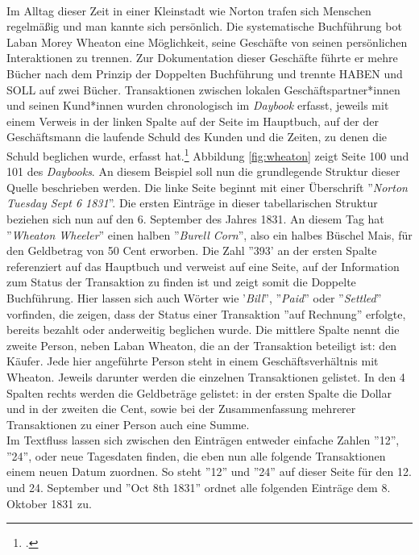 \documentclass[12pt,a4paper]{article}
\begin{document}
\\
Im Alltag dieser Zeit in einer Kleinstadt wie Norton trafen sich Menschen regelmäßig und man kannte sich persönlich. Die systematische Buchführung bot Laban Morey Wheaton eine Möglichkeit, seine Geschäfte von seinen persönlichen Interaktionen zu trennen. Zur Dokumentation dieser Geschäfte führte er mehre Bücher nach dem Prinzip der Doppelten Buchführung und trennte HABEN und SOLL auf zwei Bücher. Transaktionen zwischen lokalen Geschäftspartner*innen und seinen Kund*innen wurden chronologisch im \textit{Daybook} erfasst, jeweils mit einem Verweis in der linken Spalte auf der Seite im Hauptbuch, auf der der Geschäftsmann die laufende Schuld des Kunden und die Zeiten, zu denen die Schuld beglichen wurde, erfasst hat.\footcite[][S.7-9]{tomasek2013encoding} Abbildung \ref{fig:wheaton} zeigt Seite 100 und 101 des \textit{Daybooks}. An diesem Beispiel soll nun die grundlegende Struktur dieser Quelle beschrieben werden. Die linke Seite beginnt mit einer Überschrift ''\textit{Norton Tuesday Sept 6 1831}''. Die ersten Einträge in dieser tabellarischen Struktur beziehen sich nun auf den 6. September des Jahres 1831. An diesem Tag hat ''\textit{Wheaton Wheeler}'' einen halben ''\textit{Burell Corn}'', also ein halbes Büschel Mais, für den Geldbetrag von 50 Cent erworben. Die Zahl ''393' an der ersten Spalte referenziert auf das Hauptbuch und verweist auf eine Seite, auf der Information zum Status der Transaktion zu finden ist und zeigt somit die Doppelte Buchführung. Hier lassen sich auch Wörter wie '\textit{Bill}'', ''\textit{Paid}'' oder ''\textit{Settled}'' vorfinden, die zeigen, dass der Status einer Transaktion ''auf Rechnung'' erfolgte, bereits bezahlt oder anderweitig beglichen wurde. Die mittlere Spalte nennt die zweite Person, neben Laban Wheaton, die an der Transaktion beteiligt ist: den Käufer. Jede hier angeführte Person steht in einem Geschäftsverhältnis mit Wheaton. Jeweils darunter werden die einzelnen Transaktionen gelistet. In den 4 Spalten rechts werden die Geldbeträge gelistet: in der ersten Spalte die Dollar und in der zweiten die Cent, sowie bei der Zusammenfassung mehrerer Transaktionen zu einer Person auch eine Summe.
\\
Im Textfluss lassen sich zwischen den Einträgen entweder einfache Zahlen ''12'', ''24'', oder neue Tagesdaten finden, die eben nun alle folgende Transaktionen einem neuen Datum zuordnen. So steht ''12'' und ''24'' auf dieser Seite für den 12. und 24. September und ''Oct 8th 1831'' ordnet alle folgenden Einträge  dem 8. Oktober 1831 zu.
\\
\end{document}
